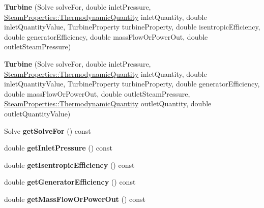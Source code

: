 \begin{DoxyCompactItemize}
\item 
\mbox{\label{class_turbine_a3c3c871b9fe57d48dd06b109794381dc}} 
{\bfseries Turbine} (Solve solve\+For, double inlet\+Pressure, \hyperlink{class_steam_properties_ae0294bedf7d178c2d8fb6aed0f62fbff}{Steam\+Properties\+::\+Thermodynamic\+Quantity} inlet\+Quantity, double inlet\+Quantity\+Value, Turbine\+Property turbine\+Property, double isentropic\+Efficiency, double generator\+Efficiency, double mass\+Flow\+Or\+Power\+Out, double outlet\+Steam\+Pressure)
\item 
\mbox{\label{class_turbine_a1ec182906c075407882de542954d9030}} 
{\bfseries Turbine} (Solve solve\+For, double inlet\+Pressure, \hyperlink{class_steam_properties_ae0294bedf7d178c2d8fb6aed0f62fbff}{Steam\+Properties\+::\+Thermodynamic\+Quantity} inlet\+Quantity, double inlet\+Quantity\+Value, Turbine\+Property turbine\+Property, double generator\+Efficiency, double mass\+Flow\+Or\+Power\+Out, double outlet\+Steam\+Pressure, \hyperlink{class_steam_properties_ae0294bedf7d178c2d8fb6aed0f62fbff}{Steam\+Properties\+::\+Thermodynamic\+Quantity} outlet\+Quantity, double outlet\+Quantity\+Value)
\item 
\mbox{\label{class_turbine_a58c73057a4b890eab2af2b42c82484e6}} 
Solve {\bfseries get\+Solve\+For} () const
\item 
\mbox{\label{class_turbine_a148ad3877851f1c3931d8a6771d750c5}} 
double {\bfseries get\+Inlet\+Pressure} () const
\item 
\mbox{\label{class_turbine_a5d907859de4acc153a32bd443238b445}} 
double {\bfseries get\+Isentropic\+Efficiency} () const
\item 
\mbox{\label{class_turbine_a92266fd994310d1842ba37c05bc40bf8}} 
double {\bfseries get\+Generator\+Efficiency} () const
\item 
\mbox{\label{class_turbine_a820a090d264b96ee84f717555545c287}} 
double {\bfseries get\+Mass\+Flow\+Or\+Power\+Out} () const
\item 
\mbox{\label{class_turbine_a1589b2364a553db7aaa875bb543d171d}} 

\end{DoxyCompactItemize}
